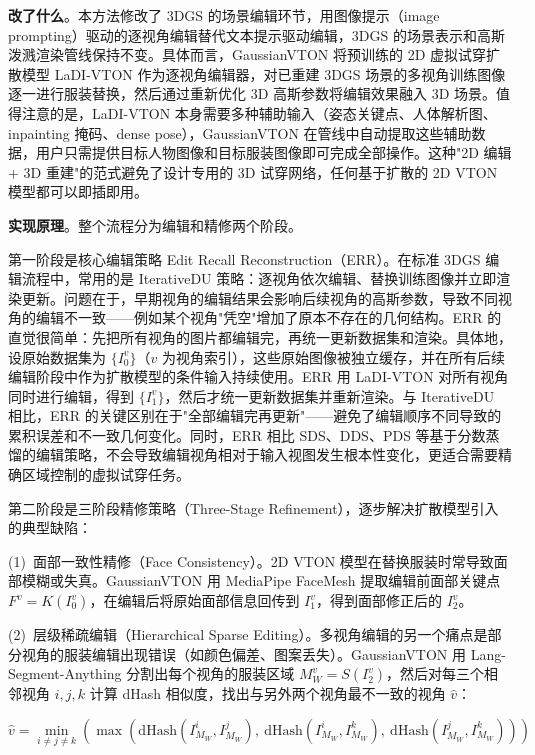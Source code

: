 \textbf{改了什么}。本方法修改了 3DGS 的场景编辑环节，用图像提示（image prompting）驱动的逐视角编辑替代文本提示驱动编辑，3DGS 的场景表示和高斯泼溅渲染管线保持不变。具体而言，GaussianVTON 将预训练的 2D 虚拟试穿扩散模型 LaDI-VTON 作为逐视角编辑器，对已重建 3DGS 场景的多视角训练图像逐一进行服装替换，然后通过重新优化 3D 高斯参数将编辑效果融入 3D 场景。值得注意的是，LaDI-VTON 本身需要多种辅助输入（姿态关键点、人体解析图、inpainting 掩码、dense pose），GaussianVTON 在管线中自动提取这些辅助数据，用户只需提供目标人物图像和目标服装图像即可完成全部操作。这种"2D 编辑 + 3D 重建"的范式避免了设计专用的 3D 试穿网络，任何基于扩散的 2D VTON 模型都可以即插即用。

\textbf{实现原理}。整个流程分为编辑和精修两个阶段。

第一阶段是核心编辑策略 Edit Recall Reconstruction（ERR）。在标准 3DGS 编辑流程中，常用的是 IterativeDU 策略：逐视角依次编辑、替换训练图像并立即渲染更新。问题在于，早期视角的编辑结果会影响后续视角的高斯参数，导致不同视角的编辑不一致——例如某个视角"凭空"增加了原本不存在的几何结构。ERR 的直觉很简单：先把所有视角的图片都编辑完，再统一更新数据集和渲染。具体地，设原始数据集为 $\{I_0^v\}$（$v$ 为视角索引），这些原始图像被独立缓存，并在所有后续编辑阶段中作为扩散模型的条件输入持续使用。ERR 用 LaDI-VTON 对所有视角同时进行编辑，得到 $\{I_1^v\}$，然后才统一更新数据集并重新渲染。与 IterativeDU 相比，ERR 的关键区别在于"全部编辑完再更新"——避免了编辑顺序不同导致的累积误差和不一致几何变化。同时，ERR 相比 SDS、DDS、PDS 等基于分数蒸馏的编辑策略，不会导致编辑视角相对于输入视图发生根本性变化，更适合需要精确区域控制的虚拟试穿任务。

第二阶段是三阶段精修策略（Three-Stage Refinement），逐步解决扩散模型引入的典型缺陷：

(1)~面部一致性精修（Face Consistency）。2D VTON 模型在替换服装时常导致面部模糊或失真。GaussianVTON 用 MediaPipe FaceMesh 提取编辑前面部关键点 $F^v = K(I_0^v)$，在编辑后将原始面部信息回传到 $I_1^v$，得到面部修正后的 $I_2^v$。

(2)~层级稀疏编辑（Hierarchical Sparse Editing）。多视角编辑的另一个痛点是部分视角的服装编辑出现错误（如颜色偏差、图案丢失）。GaussianVTON 用 Lang-Segment-Anything 分割出每个视角的服装区域 $M_W^v = S(I_2^v)$，然后对每三个相邻视角 $i, j, k$ 计算 dHash 相似度，找出与另外两个视角最不一致的视角 $\hat{v}$：

\begin{equation}
\hat{v} = \min_{i \neq j \neq k} \left(\max\left(\text{dHash}(I_{M_W}^i, I_{M_W}^j),\ \text{dHash}(I_{M_W}^i, I_{M_W}^k),\ \text{dHash}(I_{M_W}^j, I_{M_W}^k)\right)\right)
\end{equation}

